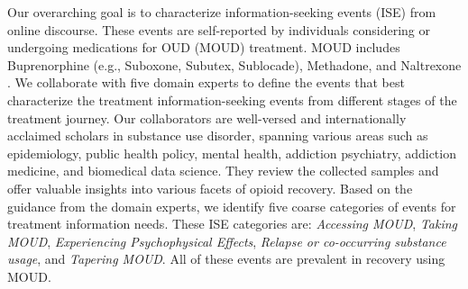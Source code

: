 \documentclass[letterpaper]{article} %
\begin{document}


Our overarching goal is to characterize information-seeking events (ISE) from online discourse. These events are self-reported by individuals considering or undergoing medications for OUD (MOUD) treatment. MOUD includes Buprenorphine (e.g., Suboxone, Subutex, Sublocade), Methadone, and Naltrexone \cite{dickson2022you}. We collaborate with five domain experts to define the events that best characterize the treatment information-seeking events from different stages of the treatment journey. Our collaborators are well-versed and internationally acclaimed scholars in substance use disorder, spanning various areas such as epidemiology, public health policy, mental health, addiction psychiatry, addiction medicine, and biomedical data science. They review the collected samples and offer valuable insights into various facets of opioid recovery. Based on the guidance from the domain experts, we identify five coarse categories of events for treatment information needs. These ISE categories are: \textit{Accessing MOUD}, \textit{Taking MOUD}, \textit{Experiencing Psychophysical Effects}, \textit{Relapse or co-occurring substance usage}, and \textit{Tapering MOUD}. All of these events are prevalent in recovery using MOUD. 
\end{document}
